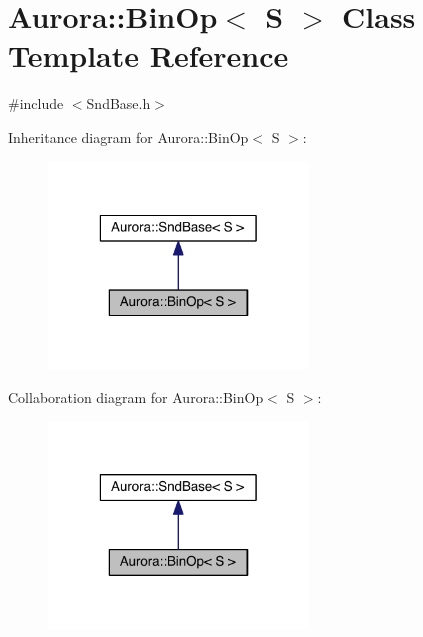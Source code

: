 \hypertarget{class_aurora_1_1_bin_op}{}\section{Aurora\+:\+:Bin\+Op$<$ S $>$ Class Template Reference}
\label{class_aurora_1_1_bin_op}


{\ttfamily \#include $<$Snd\+Base.\+h$>$}



Inheritance diagram for Aurora\+:\+:Bin\+Op$<$ S $>$\+:\nopagebreak
\begin{figure}[H]
\begin{center}
\leavevmode
\includegraphics[width=196pt]{class_aurora_1_1_bin_op__inherit__graph}
\end{center}
\end{figure}


Collaboration diagram for Aurora\+:\+:Bin\+Op$<$ S $>$\+:\nopagebreak
\begin{figure}[H]
\begin{center}
\leavevmode
\includegraphics[width=196pt]{class_aurora_1_1_bin_op__coll__graph}
\end{center}
\end{figure}
